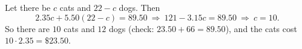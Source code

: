 Let there be $c$ cats and $22-c$ dogs. Then
\[
2.35c+5.50(22-c)=89.50\ \Longrightarrow\ 121-3.15c=89.50\ \Longrightarrow\ c=10 .
\]
So there are $10$ cats and $12$ dogs (check: $23.50+66=89.50$), and the cats cost $10\cdot2.35=\boxed{\$23.50}$.
